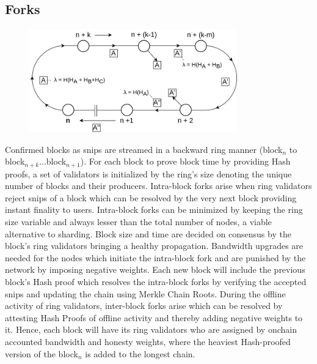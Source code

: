 \documentclass[a4paper, 10pt]{extarticle}
\begin{document}
\subsection{Forks}
\begin{figure}[h]
\begin{center}
\includegraphics[width=9cm]{intrafork}
\end{center}
\end{figure}
Confirmed blocks as snips are streamed in a backward ring manner (block$_n$ to block$_{n+k}$...block$_{n+1}$). For each block to prove block time by providing Hash proofs, a set of validators is initialized by the ring's size denoting the unique number of blocks and their producers. Intra-block forks arise when ring validators reject snips of a block which can be resolved by the very next block providing instant finality to users. Intra-block forks can be minimized by keeping the ring size variable and always lesser than the total number of nodes, a viable alternative to sharding. Block size and time are decided on consensus by the block's ring validators bringing a healthy propagation. Bandwidth upgrades are needed for the nodes which initiate the intra-block fork and are punished by the network by imposing negative weights. Each new block will include the previous block's Hash proof which resolves the intra-block forks by verifying the accepted snips and updating the chain using Merkle Chain Roots. During the offline activity of ring validators, inter-block forks arise which can be resolved by attesting Hash Proofs of offline activity and thereby adding negative weights to it. Hence, each block will have its ring validators who are assigned by onchain accounted bandwidth and honesty weights, where the heaviest Hash-proofed version of the block$_n$ is added to the longest chain.
\end{document}
